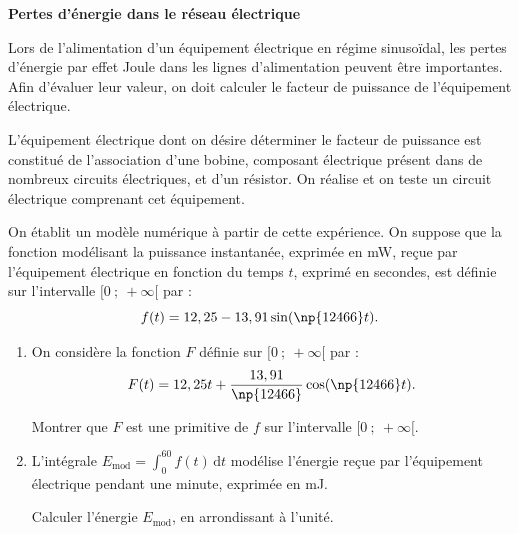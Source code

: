 \begin{center}
\textbf{Pertes d'énergie dans le réseau électrique}
\end{center}

Lors de l'alimentation d'un équipement électrique en régime sinusoïdal, les pertes d'énergie par effet Joule dans les lignes d'alimentation peuvent être importantes. Afin d'évaluer leur valeur, on doit calculer le facteur de puissance de l'équipement électrique.

\medskip

L'équipement électrique dont on désire déterminer le facteur de puissance est constitué de l'association d'une bobine, composant électrique présent dans de nombreux circuits électriques, et d'un résistor. On réalise et on teste un circuit électrique comprenant cet équipement.

\medskip

On établit un modèle numérique à partir de cette expérience. On suppose que la fonction modélisant la puissance instantanée, exprimée en mW, reçue par l'équipement électrique en fonction du temps $t$, exprimé en secondes, est définie sur l'intervalle $[0~;~+\infty[$ par :
\[f(t) = 12,25 - 13,91 \sin(\np{12466}t).\]

\begin{enumerate}[start=6]
\item On considère la fonction $F$ définie sur $[0~;~+\infty[$ par :
\[F(t) = 12,25t + \dfrac{13,91}{\np{12466}} \cos(\np{12466}t).\]

Montrer que $F$ est une primitive de $f$ sur l'intervalle $[0~;~+\infty[$.

\item L'intégrale $E_{\text{mod}} = \int_{0}^{60} f(t)\,\mathrm{d}t$ modélise l'énergie reçue par l'équipement électrique pendant une minute, exprimée en mJ.

Calculer l'énergie $E_{\text{mod}}$, en arrondissant à l'unité.
\end{enumerate}

\bigskip
